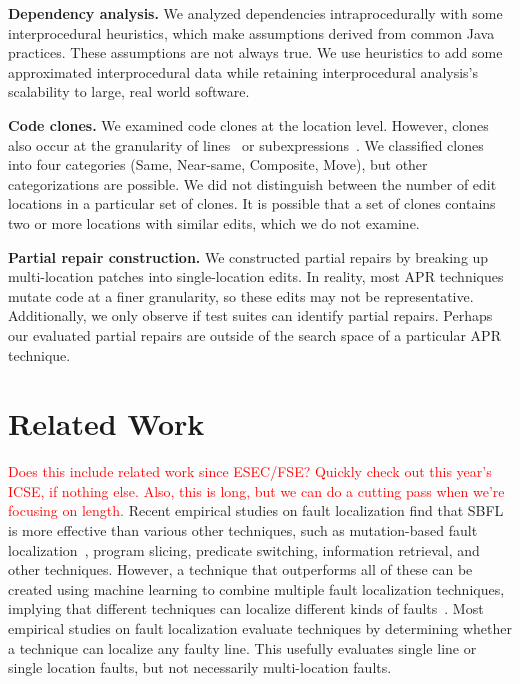 \documentclass[10pt, conference]{IEEEtran}
\newcommand\todo[1]{\textcolor{red}{#1}}
\begin{document}
\vspace{1ex}
\noindent\textbf{Dependency analysis.}
We analyzed dependencies intraprocedurally with some interprocedural 
heuristics, which make assumptions derived from common Java practices.
These assumptions are not always true. We use heuristics to add some
approximated interprocedural data while retaining interprocedural 
analysis's scalability to large, real world software.

\vspace{1ex}
\noindent\textbf{Code clones.}
We examined code clones at the location level.  However, clones also occur at the
granularity of lines~\cite{JiaClones} or
subexpressions~\cite{microclones}. We classified clones into four
categories (Same, Near-same, Composite, Move), but other categorizations 
are possible.
%
We did not distinguish between the number
of edit locations in a particular set of clones. It is possible that a set of
clones contains two or more locations with similar edits, which we do not examine. 

\vspace{1ex}
\noindent\textbf{Partial repair construction.}
We constructed partial repairs by breaking up multi-location patches
into single-location edits.
In reality, most APR techniques mutate code at a finer granularity, so
these edits may not be representative.  Additionally, we only observe if test suites
can identify partial repairs. Perhaps our evaluated partial repairs
are outside of the search space of a
particular APR technique.

\section{Related Work}
\label{sec:related}

\todo{Does this include related work since ESEC/FSE?  Quickly check out this
  year's ICSE, if nothing else.}
\todo{Also, this is long, but we can do a cutting pass when we're focusing on length.}
Recent empirical studies on fault localization find that 
SBFL is more effective than various other techniques, such as 
mutation-based fault localization~\cite{pearson2017evaluating, mut-analysis}, program 
slicing, predicate switching,  information retrieval, and other techniques. 
However, a 
technique that outperforms all of these can be created using machine learning to combine 
multiple fault localization techniques, implying that different techniques can 
localize different kinds of faults~\cite{zou2019empirical}. Most empirical 
studies on fault localization evaluate techniques by determining whether a 
technique can localize any faulty line. This usefully evaluates single line or single 
location faults, but not necessarily multi-location faults.
\end{document}
